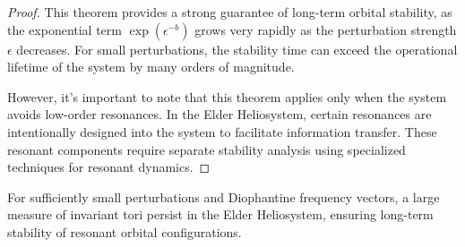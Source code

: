 \begin{proof}
This theorem provides a strong guarantee of long-term orbital stability, as the exponential term $\exp(\epsilon^{-b})$ grows very rapidly as the perturbation strength $\epsilon$ decreases. For small perturbations, the stability time can exceed the operational lifetime of the system by many orders of magnitude.

However, it's important to note that this theorem applies only when the system avoids low-order resonances. In the Elder Heliosystem, certain resonances are intentionally designed into the system to facilitate information transfer. These resonant components require separate stability analysis using specialized techniques for resonant dynamics.
\end{proof}

\begin{theorem}
For sufficiently small perturbations and Diophantine frequency vectors, a large measure of invariant tori persist in the Elder Heliosystem, ensuring long-term stability of resonant orbital configurations.
\end{theorem}

